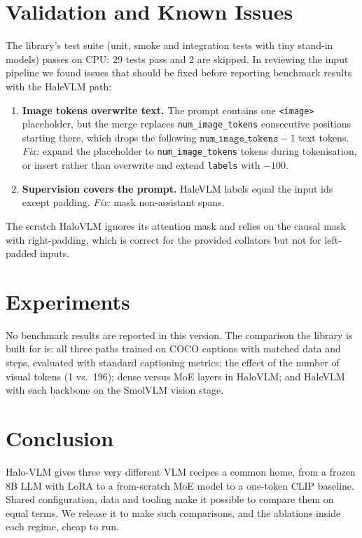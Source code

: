 \documentclass[11pt]{article}
\newcommand{\tok}[1]{\texttt{<#1>}}
\begin{document}
\section{Validation and Known Issues}

The library's test suite (unit, smoke and integration tests with tiny stand-in models)
passes on CPU: 29 tests pass and 2 are skipped. In reviewing the input pipeline we found
issues that should be fixed before reporting benchmark results with the HaleVLM path:
\begin{enumerate}
  \item \textbf{Image tokens overwrite text.} The prompt contains one \tok{image}
        placeholder, but the merge replaces \texttt{num\_image\_tokens} consecutive positions
        starting there, which drops the following $\texttt{num\_image\_tokens}-1$ text tokens.
        \emph{Fix:} expand the placeholder to \texttt{num\_image\_tokens} tokens during
        tokenisation, or insert rather than overwrite and extend \texttt{labels} with $-100$.
  \item \textbf{Supervision covers the prompt.} HaleVLM labels equal the input ids except
        padding. \emph{Fix:} mask non-assistant spans.
\end{enumerate}
The scratch HaloVLM ignores its attention mask and relies on the causal mask with
right-padding, which is correct for the provided collators but not for left-padded inputs.

\section{Experiments}

No benchmark results are reported in this version. The comparison the library is built for
is: all three paths trained on COCO captions with matched data and steps, evaluated with
standard captioning metrics; the effect of the number of visual tokens (1 vs.\ 196); dense
versus MoE layers in HaloVLM; and HaleVLM with each backbone on the SmolVLM vision stage.

\section{Conclusion}

Halo-VLM gives three very different VLM recipes a common home, from a frozen 8B LLM with
LoRA to a from-scratch MoE model to a one-token CLIP baseline. Shared configuration, data
and tooling make it possible to compare them on equal terms. We release it to make such
comparisons, and the ablations inside each regime, cheap to run.



\end{document}
